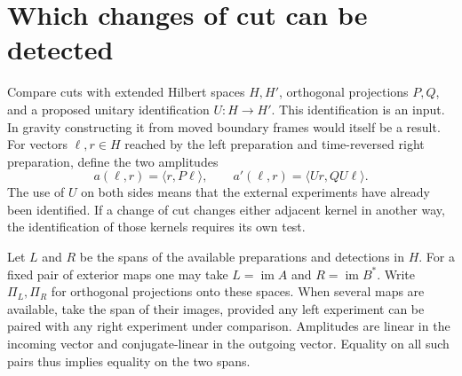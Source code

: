 \documentclass[11pt,letterpaper]{article}
\newcommand{\im}{\operatorname{im}}
\begin{document}
\section{Which changes of cut can be detected}
\label{sec:detection}
Compare cuts with extended Hilbert spaces \(H,H'\), orthogonal projections
\(P,Q\), and a proposed unitary identification \(U:H\to H'\).
This identification is an input. In gravity constructing it from moved
boundary frames would itself be a result. For vectors \(\ell,r\in H\)
reached by the left preparation and time-reversed right preparation,
define the two amplitudes
\begin{equation}
 a(\ell,r)=\langle r,P\ell\rangle,\qquad
 a'(\ell,r)=\langle Ur,QU\ell\rangle .
 \label{eq:probe}
\end{equation}
The use of \(U\) on both sides means that the external experiments have
already been identified. If a change of cut changes either adjacent kernel
in another way, the identification of those kernels requires its own test.

Let \(L\) and \(R\) be the spans of the available preparations and
detections in \(H\). For a fixed pair of exterior maps one may take
\(L=\im A\) and \(R=\im B^*\). Write \(\Pi_L,\Pi_R\) for orthogonal
projections onto these spaces. When several maps are available, take the
span of their images, provided any left experiment can be paired with any
right experiment under comparison. Amplitudes are linear in the incoming
vector and conjugate-linear in the outgoing vector. Equality on all such
pairs thus implies equality on the two spans.
\end{document}
